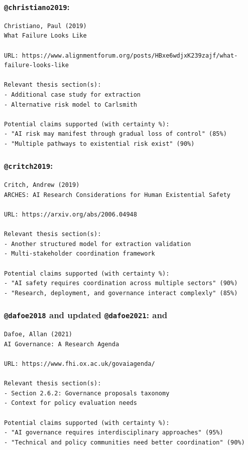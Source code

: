 \documentclass[
  11pt,
  letterpaper,
]{book}
\begin{document}
\subsubsection{\texorpdfstring{\texttt{@christiano2019}:
\textcite{christiano2019}}{@christiano2019: @christiano2019}}\label{christiano2019-christiano2019-1}

\begin{verbatim}
Christiano, Paul (2019)
What Failure Looks Like

URL: https://www.alignmentforum.org/posts/HBxe6wdjxK239zajf/what-failure-looks-like

Relevant thesis section(s):
- Additional case study for extraction
- Alternative risk model to Carlsmith

Potential claims supported (with certainty %):
- "AI risk may manifest through gradual loss of control" (85%)
- "Multiple pathways to existential risk exist" (90%)
\end{verbatim}

\subsubsection{\texorpdfstring{\texttt{@critch2019}:
\textcite{critch2019}}{@critch2019: @critch2019}}\label{critch2019-critch2019-1}

\begin{verbatim}
Critch, Andrew (2019)
ARCHES: AI Research Considerations for Human Existential Safety

URL: https://arxiv.org/abs/2006.04948

Relevant thesis section(s):
- Another structured model for extraction validation
- Multi-stakeholder coordination framework

Potential claims supported (with certainty %):
- "AI safety requires coordination across multiple sectors" (90%)
- "Research, deployment, and governance interact complexly" (85%)
\end{verbatim}

\subsubsection{\texorpdfstring{\texttt{@dafoe2018} and updated
\texttt{@dafoe2021}: \textcite{dafoe2021} and
\textcite{dafoe2018}}{@dafoe2018 and updated @dafoe2021: @dafoe2021 and @dafoe2018}}\label{dafoe2018-and-updated-dafoe2021-dafoe2021-and-dafoe2018-1}

\begin{verbatim}
Dafoe, Allan (2021)
AI Governance: A Research Agenda

URL: https://www.fhi.ox.ac.uk/govaiagenda/

Relevant thesis section(s):
- Section 2.6.2: Governance proposals taxonomy
- Context for policy evaluation needs

Potential claims supported (with certainty %):
- "AI governance requires interdisciplinary approaches" (95%)
- "Technical and policy communities need better coordination" (90%)
\end{verbatim}
\end{document}
